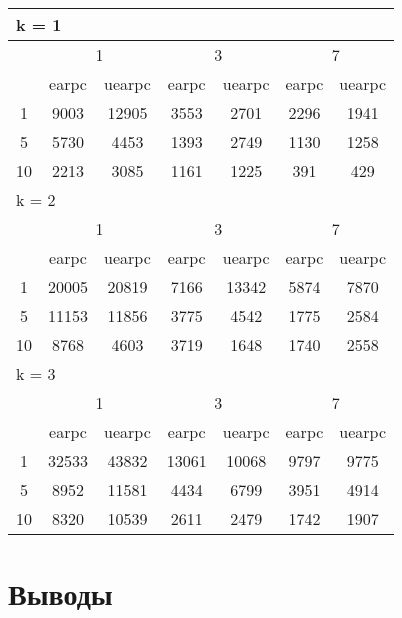 \begin{table}
  \centering
  \begin{tabular}{|*7{c|}}
    \hline
    \multicolumn{7}{|l|}{k = 1} \\
    \hline
    \multirow{2}{*}{\diagbox{$\mu$}{$\lambda$}} & \multicolumn{2}{c|}{1} & \multicolumn{2}{c|}{3} & \multicolumn{2}{c|}{7} \\
    \cline{2-7}
    & earpc & uearpc & earpc & uearpc & earpc & uearpc \\
    \hline
    1 & 9003 & 12905 & 3553& 2701 & 2296 & 1941 \\
    \hline
    5 & 5730 & 4453 & 1393 & 2749 & 1130 & 1258 \\
    \hline
    10 & 2213 & 3085 & 1161 & 1225 & 391 & 429 \\
    \hline
    \multicolumn{7}{|l|}{k = 2} \\
    \hline
    \multirow{2}{*}{\diagbox{$\mu$}{$\lambda$}} & \multicolumn{2}{c|}{1} & \multicolumn{2}{c|}{3} & \multicolumn{2}{c|}{7} \\
    \cline{2-7}
    & earpc & uearpc & earpc & uearpc & earpc & uearpc \\
    \hline
    1 & 20005 & 20819 & 7166 & 13342 & 5874 & 7870 \\
    \hline
    5 & 11153 & 11856 & 3775 & 4542 & 1775 & 2584 \\
    \hline
    10 & 8768 & 4603 & 3719 & 1648 & 1740 & 2558 \\
    \hline
    \multicolumn{7}{|l|}{k = 3} \\
    \hline
    \multirow{2}{*}{\diagbox{$\mu$}{$\lambda$}} & \multicolumn{2}{c|}{1} & \multicolumn{2}{c|}{3} & \multicolumn{2}{c|}{7} \\
    \cline{2-7}
    & earpc & uearpc & earpc & uearpc & earpc & uearpc \\
    \hline
    1 & 32533 & 43832 & 13061 & 10068 & 9797 & 9775 \\
    \hline
    5 & 8952 & 11581 & 4434 & 6799 & 3951 & 4914 \\
    \hline
    10 & 8320 & 10539 & 2611 & 2479 & 1742 & 1907 \\
    \hline
  \end{tabular}
\end{table}


\section{Выводы}
